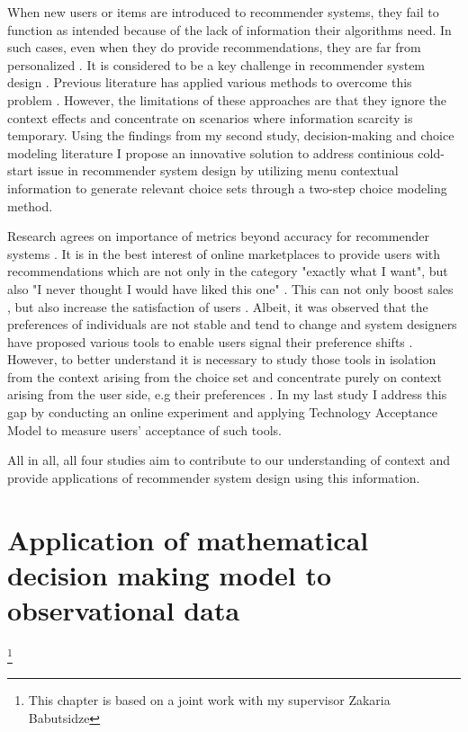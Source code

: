 \documentclass[a4paper,12pt]{article}
\begin{document}
When new users or items are introduced to recommender systems, they fail to function as intended because of the lack of information their algorithms need. In such cases, even when they do provide recommendations, they are far from personalized \citep{lika2014facing}. It is considered to be a key challenge in recommender system design \citep{park2009pairwise}. Previous literature has applied various methods to overcome this problem \citep{aharon2013off, bykau2013coping, saveski2014item, guy2009personalized}. However, the limitations of these approaches are that they ignore the context effects and concentrate on scenarios where information scarcity is temporary. Using the findings from my second study, decision-making and choice modeling literature I propose an innovative solution to address continious cold-start issue in recommender system design by utilizing menu contextual information to generate relevant choice sets through a two-step choice modeling method. 

Research agrees on importance of metrics beyond accuracy for recommender systems \citep{kaminskas2016diversity}. It is in the best interest of online marketplaces to provide users with recommendations which are not only in the category "exactly what I want", but also "I never thought I would have liked this one" \citep{kotkovSurveySerendipityRecommender2016}. This can not only boost sales \citep{songWhenHowDiversify2019}, but also increase the satisfaction of users \citep{knijnenburgExplainingUserExperience2012}. Albeit, it was observed that the preferences of individuals are not stable and tend to change and system designers have proposed various tools to enable users signal their preference shifts \citep{bostandjiev2012tasteweights,hijikata2012relation}. However, to better understand it is necessary to study those tools in isolation from the context arising from the choice set and concentrate purely on context arising from the user side, e.g their preferences \citep{adomavicius2011context}. In my last study I address this gap by conducting an online experiment and applying Technology Acceptance Model \citep{davis1985technology} to measure users' acceptance of such tools.

All in all, all four studies aim to contribute to our understanding of context and provide applications of recommender system design using this information.

\newpage

\section{Application of mathematical decision making model to observational data} \footnote{This chapter is based on a joint work with my supervisor  Zakaria Babutsidze}
\end{document}
